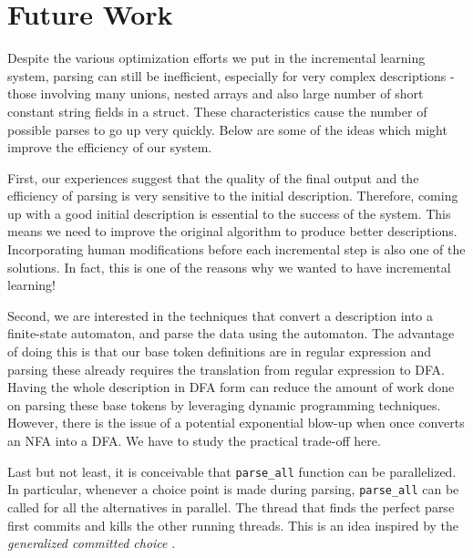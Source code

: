 \section{Future Work}
\label{sec:future}
Despite the various optimization efforts we put in
the incremental learning system, parsing can still
be inefficient, especially for very complex descriptions
- those involving many unions, nested arrays and also
large number of short constant string fields in a struct.
These characteristics cause the
number of possible parses to go up very quickly. Below
are some of the ideas which might improve the
efficiency of our system.

First, our experiences suggest that
the quality of the final output and the efficiency
of parsing is very sensitive to the initial
description. Therefore, coming up with a good
initial description is essential to the success
of the system. This means we need to improve the
original \learnpads{} algorithm to produce better
descriptions.
Incorporating human modifications 
before each incremental step is also one of the solutions.
In fact, this is one of the reasons why we wanted to
have incremental learning!

Second, we are interested in the techniques that
convert a \pads{} description into a finite-state
automaton, and parse the data using the automaton.
The advantage of doing this is that our base token
definitions are in regular expression and parsing 
these already requires the translation from regular
expression to DFA. Having the whole description in
DFA form can reduce the amount of work done on parsing
these base tokens by leveraging dynamic programming
techniques. However, there is the issue of a potential
exponential blow-up when once converts an NFA into
a DFA. We have to study the practical trade-off here.
 
Last but not least, it is conceivable that 
{\tt parse\_all} function can be parallelized. In
particular, whenever a choice point is made during
parsing, {\tt parse\_all}
can be called for all the alternatives in
parallel. The thread that finds the perfect
parse first commits and kills the other running threads.
This is an idea inspired by the {\em generalized committed 
choice} \cite{JaffarYZ07:gcc}. 
 

